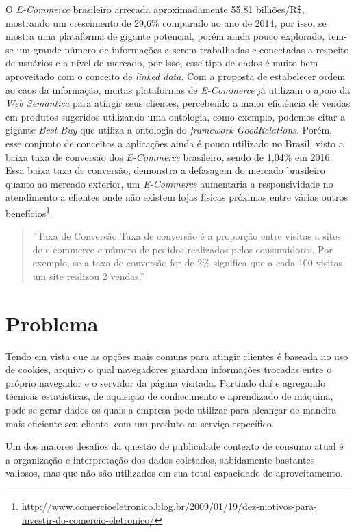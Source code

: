 O \textit{E-Commerce} brasileiro arrecada aproximadamente 55,81 bilhões/R\$, mostrando um crescimento de 29,6\% comparado ao ano de 2014, por isso, se mostra uma plataforma de gigante potencial, porém ainda pouco explorado, tem-se um grande número de informações a serem trabalhadas e conectadas a respeito de usuários e a nível de mercado, por isso, esse tipo de dados é muito bem aproveitado com o conceito de \textit{linked data}\cite{berners:2001}. Com a proposta de estabelecer ordem ao caos da informação, muitas plataformas de \textit{E-Commerce} já utilizam o apoio da \textit{Web Semântica} para atingir seus clientes, percebendo a maior eficiência de vendas em produtos sugeridos utilizando uma ontologia, como exemplo, podemos citar a gigante \textit{Best Buy}
que utiliza a ontologia do \textit{framework GoodRelations}. Porém, esse conjunto de conceitos a aplicações ainda é pouco utilizado no Brasil, visto a baixa taxa de conversão dos \textit{E-Commerce} brasileiro, sendo de 1,04\% em 2016. Essa baixa taxa de conversão, demonstra a defasagem do mercado brasileiro quanto ao mercado exterior, um \textit{E-Commerce} aumentaria a responsividade no atendimento a clientes onde não existem lojas físicas próximas entre várias outros benefícios\footnote{\url{http://www.comercioeletronico.blog.br/2009/01/19/dez-motivos-para-investir-do-comercio-eletronico/}}

\begin{quote}''Taxa de Conversão
Taxa de conversão é a proporção entre visitas a sites de
e-commerce e número de pedidos realizados pelos
consumidores. Por exemplo, se a taxa de conversão for de
2\% significa que a cada 100 visitas um site realizou 2
vendas\cite{convension:2016}.''
\end{quote}

\section{Problema}

Tendo em vista que as opções mais comuns para atingir clientes é baseada no uso de cookies, arquivo o qual navegadores guardam informações trocadas entre o próprio navegador e o servidor da página visitada. Partindo daí e agregando técnicas estatísticas, de aquisição de conhecimento e aprendizado de máquina, pode-se gerar dados os quais a empresa pode utilizar para alcançar de maneira mais eficiente seu cliente, com um produto ou serviço específico\cite{boland:2014}.

Um dos maiores desafios da questão de publicidade contexto de consumo atual é a organização e interpretação dos dados coletados, sabidamente bastantes valiosos, mas que não são utilizados em sua total capacidade de aproveitamento\cite{zamanzadeh:2013}.

